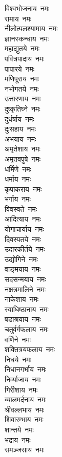 \begin{multicols}{2}
\begin{flushleft}
विश्वभोजनाय~नमः\\
रामाय~नमः\\
नीलोत्पलश्यामाय~नमः\\
ज्ञानस्कन्धाय~नमः\\
महाद्युतये~नमः\hfill{}\\
पवित्रपादाय~नमः\\
पापारये~नमः\\
मणिपूराय~नमः\\
नभोगतये~नमः\\
उत्तारणाय~नमः\\
दुष्कृतिघ्ने~नमः\\
दुर्धर्षाय~नमः\\
दुःसहाय~नमः\\
अभयाय~नमः\\
अमृतेशाय~नमः\hfill{}\\
अमृतवपुषे~नमः\\
धर्मिणे~नमः\\
धर्माय~नमः\\
कृपाकराय~नमः\\
भर्गाय~नमः\\
विवस्वते~नमः\\
आदित्याय~नमः\\
योगाचार्याय~नमः\\
दिवस्पतये~नमः\\
उदारकीर्तये~नमः\hfill{}\\
उद्योगिने~नमः\\
वाङ्मयाय~नमः\\
सदसन्मयाय~नमः\\
नक्षत्रमालिने~नमः\\
नाकेशाय~नमः\\
स्वाधिष्ठानाय~नमः\\
षडाश्रयाय~नमः\\
चतुर्वर्गफलाय~नमः\\
वर्णिने~नमः\\
शक्तित्रयफलाय~नमः\hfill{}\\
निधये~नमः\\
निधानगर्भाय~नमः\\
निर्व्याजाय~नमः\\
गिरीशाय~नमः\\
व्यालमर्दनाय~नमः\\
श्रीवल्लभाय~नमः\\
शिवारम्भाय~नमः\\
शान्तये~नमः\\
भद्राय~नमः\\
समञ्जसाय~नमः\hfill{}\\

\end{flushleft}
\end{multicols}
